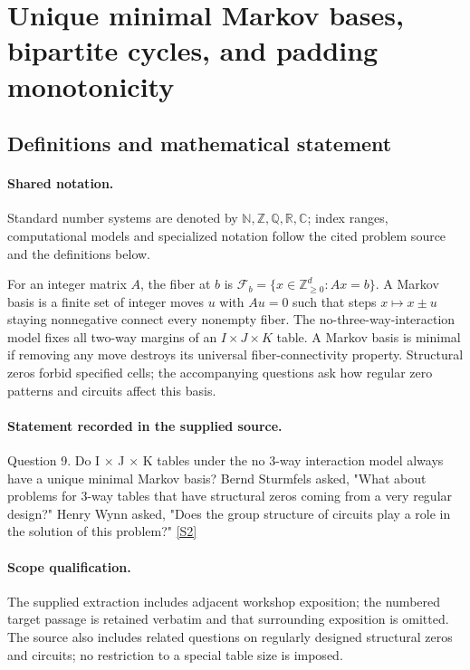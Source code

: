 \documentclass[11pt]{article}
\newcommand{\sref}[2]{\hyperlink{source:#1:#2}{[S#2]}}
\begin{document}
\section{Unique minimal Markov bases, bipartite cycles, and padding monotonicity}\label{statement}

\subsection{Definitions and mathematical statement}

\paragraph{Shared notation.}Standard number systems are denoted by $\mathbb N,\mathbb Z,\mathbb Q,\mathbb R,\mathbb C$; index ranges, computational models and specialized notation follow the cited problem source and the definitions below.


For an integer matrix $A$, the fiber at $b$ is $\mathcal F_b=\{x\in\mathbb Z_{\ge0}^d:Ax=b\}$. A Markov basis is a finite set of integer moves $u$ with $Au=0$ such that steps $x\mapsto x\pm u$ staying nonnegative connect every nonempty fiber. The no-three-way-interaction model fixes all two-way margins of an $I\times J\times K$ table. A Markov basis is minimal if removing any move destroys its universal fiber-connectivity property. Structural zeros forbid specified cells; the accompanying questions ask how regular zero patterns and circuits affect this basis.
\paragraph{Statement recorded in the supplied source.}
Question 9. Do I × J × K tables under the no 3-way interaction model always have a unique minimal Markov basis? Bernd Sturmfels asked, "What about problems for 3-way tables that have structural zeros coming from a very regular design?" Henry Wynn asked, "Does the group structure of circuits play a role in the solution of this problem?" \sref{statement}{2}
\paragraph{Scope qualification.}
The supplied extraction includes adjacent workshop exposition; the numbered target passage is retained verbatim and that surrounding exposition is omitted. The source also includes related questions on regularly designed structural zeros and circuits; no restriction to a special table size is imposed.
\end{document}
